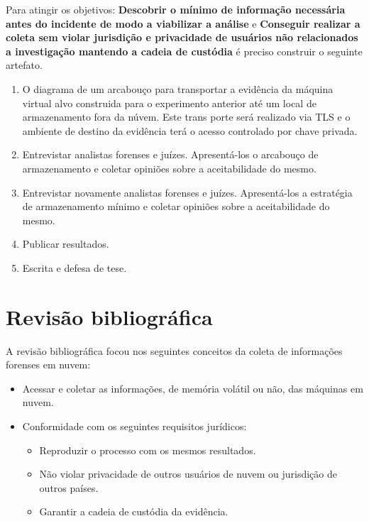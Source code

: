 \documentclass[12pt,				%
	openright,			%
	oneside,			%
	a4paper,			%
	english,			%
	brazil				%
	]{abntex2}
\begin{document}
Para atingir os objetivos: \textbf{Descobrir o mínimo de informação necessária antes do incidente de modo a viabilizar a análise} e \textbf{Conseguir realizar a coleta sem violar
jurisdição e privacidade de usuários não relacionados a investigação mantendo a cadeia de custódia} é preciso construir o seguinte artefato.

\begin{enumerate}

\item O diagrama de um arcabouço para transportar a evidência da máquina virtual alvo construida para o experimento anterior até um local de armazenamento fora da núvem. Este trans
porte será realizado via TLS e o ambiente de destino da evidência terá o acesso controlado por chave privada.

\item Entrevistar analistas forenses e juízes. Apresentá-los o arcabouço de armazenamento e coletar opiniões sobre a aceitabilidade do mesmo.

\item Entrevistar novamente analistas forenses e juízes. Apresentá-los a estratégia de armazenamento mínimo e coletar opiniões sobre a aceitabilidade do mesmo. 

\item Publicar resultados.

\item Escrita e defesa de tese.

\end{enumerate}

\chapter{Revisão bibliográfica} \label{chap:related}
A revisão bibliográfica focou nos seguintes conceitos da coleta de informações forenses em nuvem:

\begin{itemize}
 \item Acessar e coletar as informações, de memória volátil ou não, das máquinas em nuvem.
 \item Conformidade com os seguintes requisitos jurídicos: 
 \begin{itemize}
  \item Reproduzir o processo com os mesmos resultados.
  \item Não violar privacidade de outros usuários de nuvem ou jurisdição de outros países.
  \item Garantir a cadeia de custódia da evidência.
 \end{itemize}
\end{itemize}
\end{document}
